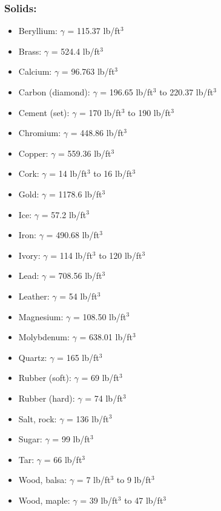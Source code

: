\subsubsection{Solids:}

\begin{itemize}
\item Beryllium: $\gamma$ = 115.37 lb/ft$^{3}$
\item Brass: $\gamma$ = 524.4 lb/ft$^{3}$
\item Calcium: $\gamma$ = 96.763 lb/ft$^{3}$
\item Carbon (diamond): $\gamma$ = 196.65 lb/ft$^{3}$ to 220.37 lb/ft$^{3}$
\item Cement (set): $\gamma$ = 170 lb/ft$^{3}$ to 190 lb/ft$^{3}$ 
\item Chromium: $\gamma$ = 448.86 lb/ft$^{3}$
\item Copper: $\gamma$ = 559.36 lb/ft$^{3}$
\item Cork: $\gamma$ = 14 lb/ft$^{3}$ to 16 lb/ft$^{3}$
\item Gold: $\gamma$ = 1178.6 lb/ft$^{3}$
\item Ice: $\gamma$ = 57.2 lb/ft$^{3}$
\item Iron: $\gamma$ = 490.68 lb/ft$^{3}$
\item Ivory: $\gamma$ = 114 lb/ft$^{3}$ to 120 lb/ft$^{3}$
\item Lead: $\gamma$ = 708.56 lb/ft$^{3}$
\item Leather: $\gamma$ = 54 lb/ft$^{3}$
\item Magnesium: $\gamma$ = 108.50 lb/ft$^{3}$
\item Molybdenum: $\gamma$ = 638.01 lb/ft$^{3}$
\item Quartz: $\gamma$ = 165 lb/ft$^{3}$
\item Rubber (soft): $\gamma$ = 69 lb/ft$^{3}$
\item Rubber (hard): $\gamma$ = 74 lb/ft$^{3}$
\item Salt, rock: $\gamma$ = 136 lb/ft$^{3}$
\item Sugar: $\gamma$ = 99 lb/ft$^{3}$
\item Tar: $\gamma$ = 66 lb/ft$^{3}$
\item Wood, balsa: $\gamma$ = 7 lb/ft$^{3}$ to 9 lb/ft$^{3}$
\item Wood, maple: $\gamma$ = 39 lb/ft$^{3}$ to 47 lb/ft$^{3}$
\end{itemize}










